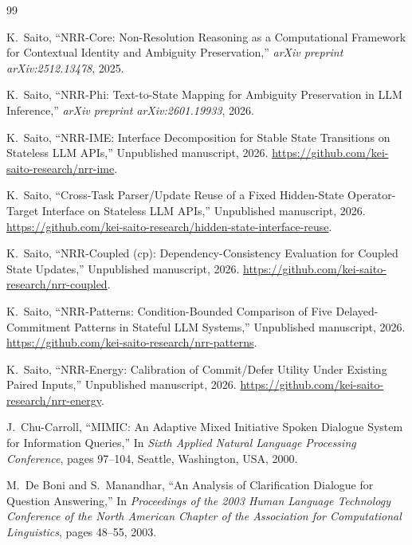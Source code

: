 \documentclass[11pt]{article}
\renewcommand{\_}{\textunderscore\hspace{0pt}}
\begin{document}
\begin{thebibliography}{99}
\raggedright

K.~Saito,
\newblock ``NRR-Core: Non-Resolution Reasoning as a Computational Framework for Contextual Identity and Ambiguity Preservation,''
\newblock \emph{arXiv preprint arXiv:2512.13478}, 2025.

K.~Saito,
\newblock ``NRR-Phi: Text-to-State Mapping for Ambiguity Preservation in LLM Inference,''
\newblock \emph{arXiv preprint arXiv:2601.19933}, 2026.

K.~Saito,
\newblock ``NRR-IME: Interface Decomposition for Stable State Transitions on Stateless LLM APIs,''
\newblock Unpublished manuscript, 2026.
\url{https://github.com/kei-saito-research/nrr-ime}.

K.~Saito,
\newblock ``Cross-Task Parser/Update Reuse of a Fixed Hidden-State Operator-Target Interface on Stateless LLM APIs,''
\newblock Unpublished manuscript, 2026.
\url{https://github.com/kei-saito-research/hidden-state-interface-reuse}.

K.~Saito,
\newblock ``NRR-Coupled (cp): Dependency-Consistency Evaluation for Coupled State Updates,''
\newblock Unpublished manuscript, 2026.
\url{https://github.com/kei-saito-research/nrr-coupled}.

K.~Saito,
\newblock ``NRR-Patterns: Condition-Bounded Comparison of Five Delayed-Commitment Patterns in Stateful LLM Systems,''
\newblock Unpublished manuscript, 2026.
\url{https://github.com/kei-saito-research/nrr-patterns}.

K.~Saito,
\newblock ``NRR-Energy: Calibration of Commit/Defer Utility Under Existing Paired Inputs,''
\newblock Unpublished manuscript, 2026.
\url{https://github.com/kei-saito-research/nrr-energy}.

J.~Chu-Carroll,
\newblock ``MIMIC: An Adaptive Mixed Initiative Spoken Dialogue System for Information Queries,''
\newblock In \emph{Sixth Applied Natural Language Processing Conference}, pages 97--104, Seattle, Washington, USA, 2000.

M.~De Boni and S.~Manandhar,
\newblock ``An Analysis of Clarification Dialogue for Question Answering,''
\newblock In \emph{Proceedings of the 2003 Human Language Technology Conference of the North American Chapter of the Association for Computational Linguistics}, pages 48--55, 2003.


\end{thebibliography}
\end{document}
